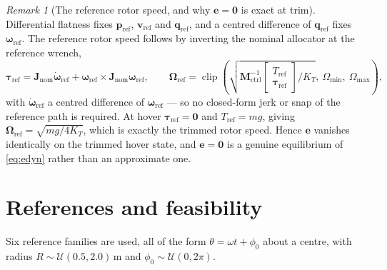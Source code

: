 \documentclass[11pt,a4paper,twoside,openright]{report}
\newcommand{\clip}{\operatorname{clip}}
\renewcommand{\vec}[1]{\bm{#1}}
\newcommand{\mat}[1]{\bm{#1}}
\newcommand{\err}{\vec{e}}
\newcommand{\quat}{\vec{q}}
\newcommand{\bodyrate}{\vec{\omega}}
\newcommand{\refsym}{\mathrm{ref}}
\theoremstyle{plain}
\theoremstyle{definition}
\theoremstyle{remark}
\newtheorem{remark}[theorem]{Remark}
\begin{document}
	\begin{remark}[The reference rotor speed, and why $\err=\vec 0$ is exact at trim]
		\label{rem:omref}
		Differential flatness fixes $\vec p_\refsym$, $\vec v_\refsym$ and
		$\quat_\refsym$, and a centred difference of $\quat_\refsym$ fixes
		$\bodyrate_\refsym$. The reference rotor speed follows by inverting the
		nominal allocator at the reference wrench,
		\begin{equation}
			\vec\tau_\refsym=\mat J_\mathrm{nom}\dot{\bodyrate}_\refsym
			+\bodyrate_\refsym\times\mat J_\mathrm{nom}\bodyrate_\refsym,
			\qquad
			\vec\Omega_\refsym=\clip\!\left(\sqrt{\mat M_\mathrm{ctrl}^{-1}
				\begin{bmatrix}T_\refsym\\ \vec\tau_\refsym\end{bmatrix}\Big/K_T},\
			\Omega_{\min},\ \Omega_{\max}\right),
			\label{eq:omref}
		\end{equation}
		with $\dot{\bodyrate}_\refsym$ a centred difference of $\bodyrate_\refsym$ ---
		so no closed-form jerk or snap of the reference path is required. At hover
		$\vec\tau_\refsym=\vec 0$ and $T_\refsym=mg$, giving
		$\vec\Omega_\refsym=\sqrt{mg/4K_T}$, which is exactly the trimmed rotor speed.
		Hence $\err$ vanishes identically on the trimmed hover state, and $\err=\vec 0$
		is a genuine equilibrium of \cref{eq:edyn} rather than an approximate one.
	\end{remark}

	\section{References and feasibility}
	\label{sec:feasibility}

	Six reference families are used, all of the form $\theta=\omega t+\phi_0$ about
	a centre, with radius $R\sim\mathcal U(0.5,2.0)\,\si{\metre}$ and
	$\phi_0\sim\mathcal U(0,2\pi)$.
\end{document}

